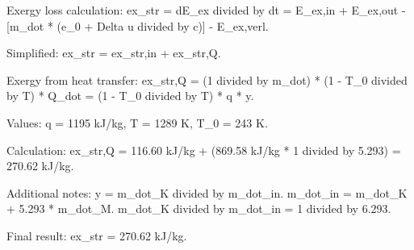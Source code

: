 Exergy loss calculation:  
ex_str = dE_ex divided by dt = E_ex,in + E_ex,out - [m_dot * (e_0 + Delta u divided by c)] - E_ex,verl.  

Simplified:  
ex_str = ex_str,in + ex_str,Q.  

Exergy from heat transfer:  
ex_str,Q = (1 divided by m_dot) * (1 - T_0 divided by T) * Q_dot = (1 - T_0 divided by T) * q * y.  

Values:  
q = 1195 kJ/kg, T = 1289 K, T_0 = 243 K.  

Calculation:  
ex_str,Q = 116.60 kJ/kg + (869.58 kJ/kg * 1 divided by 5.293) = 270.62 kJ/kg.  

Additional notes:  
y = m_dot_K divided by m_dot_in.  
m_dot_in = m_dot_K + 5.293 * m_dot_M.  
m_dot_K divided by m_dot_in = 1 divided by 6.293.  

Final result:  
ex_str = 270.62 kJ/kg.